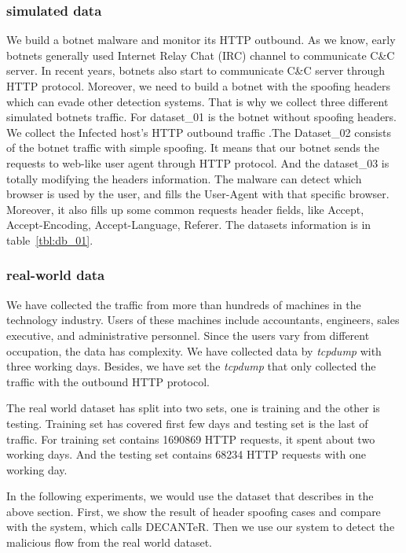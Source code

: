 \subsubsection{simulated data} 
We build a botnet malware and monitor its HTTP outbound. As we know, early botnets generally used Internet Relay Chat (IRC) channel to communicate C\&C server. In recent years, botnets also start to communicate C\&C server through HTTP protocol. Moreover, we need to build a botnet with the spoofing headers which can evade other detection systems. That is why we collect three different simulated botnets traffic. For dataset\_01 is the botnet without spoofing headers. We collect the Infected host's HTTP outbound traffic .The Dataset\_02 consists of the botnet traffic with simple spoofing. It means that our botnet sends the requests to web-like user agent through HTTP protocol. And the dataset\_03 is totally modifying the headers information. The malware can detect which browser is used by the user, and fills the User-Agent with that specific browser. Moreover, it also fills up some common requests header fields, like Accept, Accept-Encoding, Accept-Language, Referer. The datasets information is in table~\ref{tbl:db_01}.\\

\subsubsection{real-world data}

We have collected the traffic from more than hundreds of machines in the technology industry. Users of these machines include accountants, engineers, sales executive, and administrative personnel. Since the users vary from different occupation, the data has complexity. We have collected data by \textit{tcpdump} with three working days. Besides, we have set the \textit{tcpdump} that only collected the traffic with the outbound HTTP protocol.

The real world dataset has split into two sets, one is training and the other is testing. Training set has covered first few days and testing set is the last of traffic. For training set contains 1690869 HTTP requests, it spent about two working days. And the testing set contains 68234 HTTP requests with one working day.

In the following experiments, we would use the dataset that describes in the above section. First, we show the result of header spoofing cases and compare with the system, which calls DECANTeR. Then we use our system to detect the malicious flow from the real world dataset.



